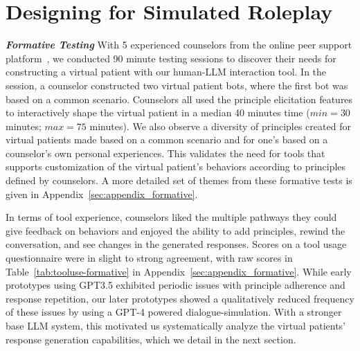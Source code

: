 
\section{Designing for Simulated Roleplay}

\textbf{\textit{Formative Testing}} With 5 experienced counselors from the online peer support platform~\citeauthor{7cupswebsite}, we conducted 90 minute testing sessions to discover their needs for constructing a virtual patient with our human-LLM interaction tool. In the session, a counselor constructed two virtual patient bots, where the first bot was based on a common scenario. Counselors all used the principle elicitation features to interactively shape the virtual patient in a median 40 minutes time ($min = 30$ minutes; $max = 75$ minutes). We also observe a diversity of principles created for virtual patients made based on a common scenario and for one's based on a counselor's own personal experiences. This validates the need for tools that supports customization of the virtual patient's behaviors according to principles defined by counselors. A more detailed set of themes from these formative tests is given in Appendix~\ref{sec:appendix_formative}.

In terms of tool experience, counselors liked the multiple pathways they could give feedback on behaviors and enjoyed the ability to add principles, rewind the conversation, and see changes in the generated responses. Scores on a tool usage questionnaire were in slight to strong agreement, with raw scores in Table~\ref{tab:tooluse-formative} in Appendix~\ref{sec:appendix_formative}.  While early prototypes using GPT3.5 exhibited periodic issues with principle adherence and response repetition, our later prototypes showed a qualitatively reduced frequency of these issues by using a GPT-4 powered dialogue-simulation. With a stronger base LLM system, this motivated us systematically analyze the virtual patients' response generation capabilities, which we detail in the next section.  

